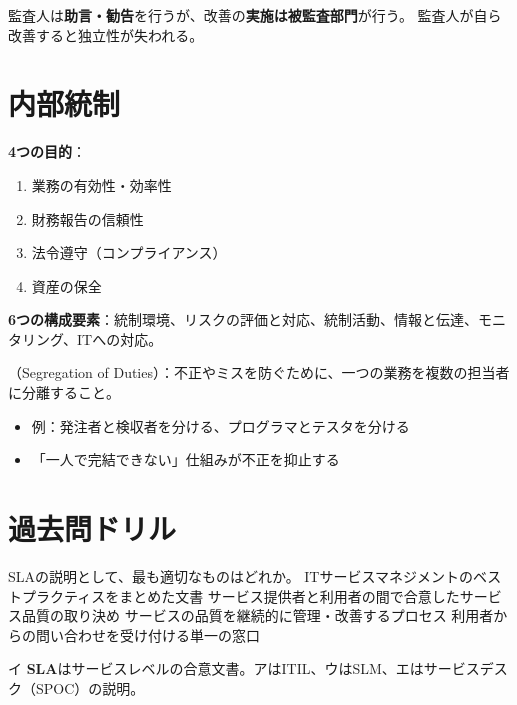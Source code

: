 \begin{pitfall}
監査人は\textbf{助言・勧告}を行うが、改善の\textbf{実施は被監査部門}が行う。
監査人が自ら改善すると独立性が失われる。
\end{pitfall}

\section{内部統制}

\begin{teigi}
\textbf{4つの目的}：
\begin{enumerate}
  \item 業務の有効性・効率性
  \item 財務報告の信頼性
  \item 法令遵守（コンプライアンス）
  \item 資産の保全
\end{enumerate}
\textbf{6つの構成要素}：統制環境、リスクの評価と対応、統制活動、情報と伝達、モニタリング、ITへの対応。
\end{teigi}

\begin{teigi}
（Segregation of Duties）：不正やミスを防ぐために、一つの業務を複数の担当者に分離すること。
\begin{itemize}
  \item 例：発注者と検収者を分ける、プログラマとテスタを分ける
  \item 「一人で完結できない」仕組みが不正を抑止する
\end{itemize}
\end{teigi}

\section{過去問ドリル}


\begin{itpmon}{%
SLAの説明として、最も適切なものはどれか。}
\sentakushi
  {ITサービスマネジメントのベストプラクティスをまとめた文書}
  {サービス提供者と利用者の間で合意したサービス品質の取り決め}
  {サービスの品質を継続的に管理・改善するプロセス}
  {利用者からの問い合わせを受け付ける単一の窓口}
\end{itpmon}
\begin{kaisetsu}{イ}
\textbf{SLA}はサービスレベルの合意文書。アはITIL、ウはSLM、エはサービスデスク（SPOC）の説明。
\end{kaisetsu}

